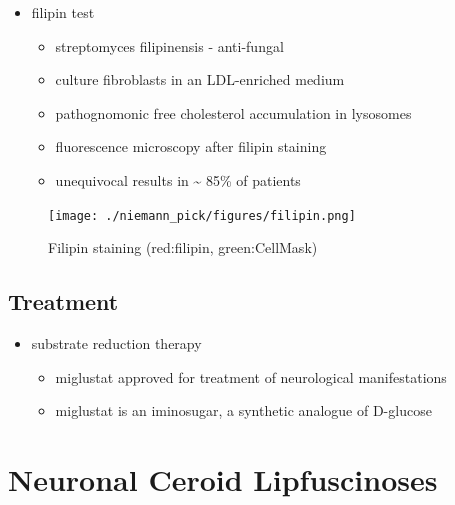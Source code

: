 \documentclass{scrartcl}
\begin{document}
\begin{itemize}
\item filipin test
\begin{itemize}
\item streptomyces filipinensis - anti-fungal
\item culture fibroblasts in an LDL-enriched medium
\item pathognomonic free cholesterol accumulation in lysosomes
\item fluorescence microscopy after filipin staining
\item unequivocal results in \textasciitilde{} 85\% of patients
\end{itemize}
\end{itemize}

\begin{figure}[htbp]
\centering
\texttt{[image: ./niemann\_pick/figures/filipin.png]}
\caption{\label{fig:org92744f0}
Filipin staining (red:filipin, green:CellMask)}
\end{figure}

\subsection{Treatment}
\label{sec:orgc161d4f}
\begin{itemize}
\item substrate reduction therapy
\begin{itemize}
\item miglustat approved for treatment of neurological manifestations
\item miglustat is an iminosugar, a synthetic analogue of D-glucose
\end{itemize}
\end{itemize}

\section{Neuronal Ceroid Lipfuscinoses}
\label{sec:orga023b2f}
\end{document}
